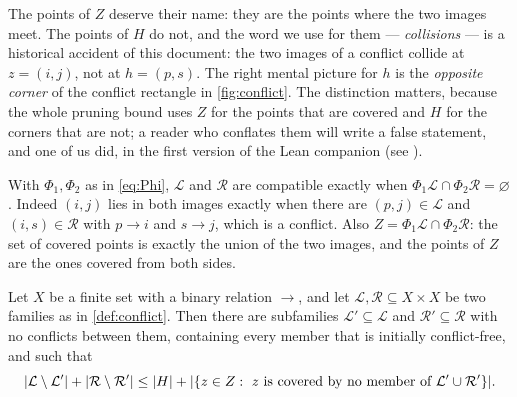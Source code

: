 \begin{remark}\label{rem:names}
The points of $Z$ deserve their name: they are the points where the two images meet. The points of
$H$ do not, and the word we use for them --- \emph{collisions} --- is a historical accident of this
document: the two images of a conflict collide at $z=(i,j)$, not at $h=(p,s)$.  The right mental
picture for $h$ is the \emph{opposite corner} of the conflict rectangle in \cref{fig:conflict}.  The
distinction matters, because the whole pruning bound uses $Z$ for the points that are covered and $H$
for the corners that are not; a reader who conflates them will write a false statement, and one of us
did, in the first version of the Lean companion (see ).
\end{remark}

\begin{remark}\label{rem:compat}
With $\Phi_1,\Phi_2$ as in \eqref{eq:Phi}, $\mathcal L$ and $\mathcal R$ are compatible exactly when
$\Phi_1\mathcal L\cap\Phi_2\mathcal R=\varnothing$. Indeed $(i,j)$ lies in both images exactly when
there are $(p,j)\in\mathcal L$ and $(i,s)\in\mathcal R$ with $p\to i$ and $s\to j$, which is a
conflict. Also $Z=\Phi_1\mathcal L\cap\Phi_2\mathcal R$: the set of covered points is exactly the union
of the two images, and the points of $Z$ are the ones covered from both sides.
\end{remark}

\begin{lemma}[Pruning]\label{lem:pruning}
Let $X$ be a finite set with a binary relation $\to$, and let
$\mathcal L,\mathcal R\subseteq X\times X$ be two families as in \cref{def:conflict}. Then there are
subfamilies $\mathcal L'\subseteq\mathcal L$ and $\mathcal R'\subseteq\mathcal R$ with no conflicts
between them, containing every member that is initially conflict-free, and such that
\begin{equation}\label{eq:pruning-bound}
 \lvert \mathcal L\setminus\mathcal L'\rvert+\lvert \mathcal R\setminus\mathcal R'\rvert
 \le\lvert H\rvert+\lvert \{z\in Z:\ z\text{ is covered by no member of }\mathcal L'\cup\mathcal R'\}\rvert .
\end{equation}
\end{lemma}


